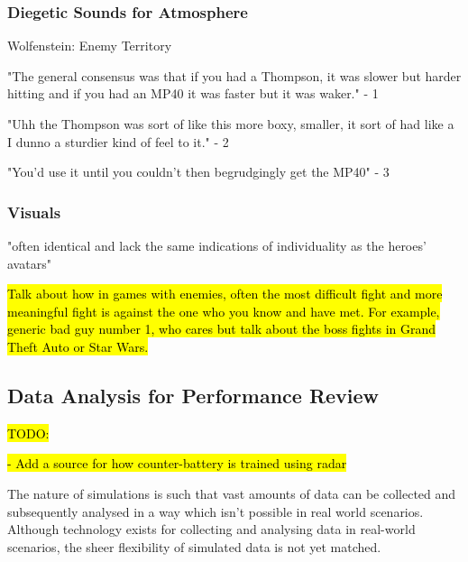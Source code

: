 \documentclass{article}
\begin{document}
\subsubsection{Diegetic Sounds for Atmosphere}

 \cite{diegeticSounds1}



Wolfenstein: Enemy Territory


"The general consensus was that if you had a Thompson, it was slower but harder hitting and if you had an MP40 it was faster but it was waker." - 1

"Uhh the Thompson was sort of like this more boxy, smaller, it sort of had like a I dunno a sturdier kind of feel to it." - 2

"You'd use it until you couldn't then begrudgingly get the MP40" - 3

\subsubsection{Visuals}

"often identical and lack the same indications of individuality as
the heroes’ avatars"

\hl{Talk about how in games with enemies, often the most difficult fight and more meaningful fight is against the one who you know and have met.
For example, generic bad guy number 1, who cares but talk about the boss fights in Grand Theft Auto or Star Wars.}



\subsection{Data Analysis for Performance Review}

\hl{TODO:} 

\hl{- Add a source for how counter-battery is trained using radar}

The nature of simulations is such that vast amounts of data can be collected and subsequently analysed in a way which isn't possible in real world scenarios. Although technology exists for collecting and analysing data in real-world scenarios, the sheer flexibility of simulated data is not yet matched.
\end{document}
